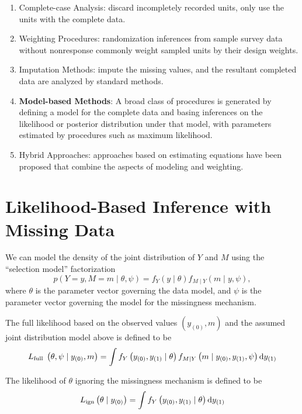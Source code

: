 \begin{enumerate}
	\item Complete-case Analysis: discard incompletely recorded units, only use the units with the complete data.
	\item Weighting Procedures: randomization inferences from sample survey data without nonresponse commonly weight sampled units by their design weights.
	\item Imputation Methods: impute the missing values, and the resultant completed data are analyzed by standard methods.
	\item \textbf{Model-based Methods}: A broad class of procedures is generated by defining a model for the complete data and basing inferences on the likelihood or posterior distribution under that model, with parameters estimated by procedures such as maximum likelihood.
	\item Hybrid Approaches: approaches based on estimating equations have been
	      proposed that combine the aspects of modeling and weighting.
\end{enumerate}

\section{Likelihood-Based Inference with Missing Data}

We can model the density of the joint distribution of \(Y\) and \(M\) using the ``selection model'' factorization
\begin{equation*}
	p(Y=y,M=m\mid\theta,\psi)=f_{Y}(y\mid\theta)f_{M\mid Y}(m\mid y,\psi),
\end{equation*}
where \(\theta\) is the parameter vector governing the data model, and \(\psi\) is the parameter vector governing the model for the missingness mechanism.

The full likelihood based on the observed values \(\left(y_{(0)}, m\right)\) and the assumed joint distribution model above is defined to be
\begin{equation}
	L_{\text {full }}\left(\theta, \psi \mid y_{(0)}, m\right)=\int f_{Y}\left(y_{(0)}, y_{(1)} \mid \theta\right) f_{M \mid Y}\left(m \mid y_{(0)}, y_{(1)}, \psi\right) \mathop{}\!\mathrm{d} y_{(1)}
\end{equation}

The likelihood of \(\theta\) ignoring the missingness mechanism is defined to be
\begin{equation}
	L_{\mathrm{ign}}\left(\theta \mid y_{(0)}\right)=\int f_{Y}\left(y_{(0)}, y_{(1)} \mid \theta\right) \mathop{}\!\mathrm{d} y_{(1)}
\end{equation}

